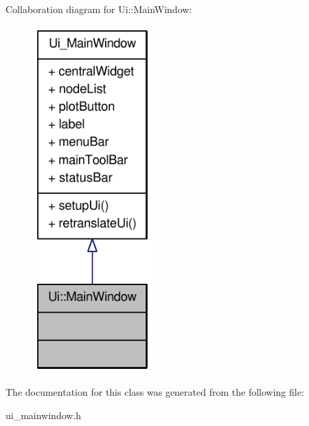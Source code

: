 Collaboration diagram for Ui::MainWindow:\nopagebreak
\begin{figure}[H]
\begin{center}
\leavevmode
\includegraphics[width=130pt]{classUi_1_1MainWindow__coll__graph}
\end{center}
\end{figure}


The documentation for this class was generated from the following file:\begin{DoxyCompactItemize}
\item 
ui\_\-mainwindow.h\end{DoxyCompactItemize}
